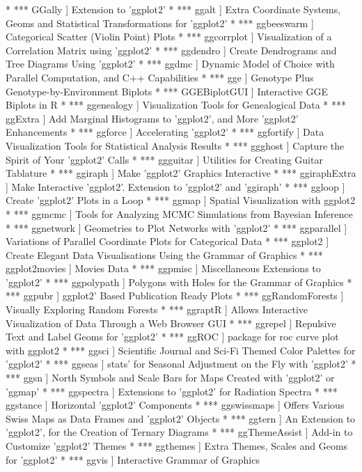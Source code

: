 * ***	GGally	]	Extension to 'ggplot2'
* ***	ggalt	]	Extra Coordinate Systems, Geoms and Statistical Transformations for 'ggplot2'
* ***	ggbeeswarm	]	Categorical Scatter (Violin Point) Plots
* ***	ggcorrplot	]	Visualization of a Correlation Matrix using 'ggplot2'
* ***	ggdendro	]	Create Dendrograms and Tree Diagrams Using 'ggplot2'
* ***	ggdmc	]	Dynamic Model of Choice with Parallel Computation, and C++ Capabilities
* ***	gge	]	Genotype Plus Genotype-by-Environment Biplots
* ***	GGEBiplotGUI	]	Interactive GGE Biplots in R
* ***	ggenealogy	]	Visualization Tools for Genealogical Data
* ***	ggExtra	]	Add Marginal Histograms to 'ggplot2', and More 'ggplot2' Enhancements
* ***	ggforce	]	Accelerating 'ggplot2'
* ***	ggfortify	]	Data Visualization Tools for Statistical Analysis Results
* ***	ggghost	]	Capture the Spirit of Your 'ggplot2' Calls
* ***	ggguitar	]	Utilities for Creating Guitar Tablature
* ***	ggiraph	]	Make 'ggplot2' Graphics Interactive
* ***	ggiraphExtra	]	Make Interactive 'ggplot2'. Extension to 'ggplot2' and 'ggiraph'
* ***	ggloop	]	Create 'ggplot2' Plots in a Loop
* ***	ggmap	]	Spatial Visualization with ggplot2
* ***	ggmcmc	]	Tools for Analyzing MCMC Simulations from Bayesian Inference
* ***	ggnetwork	]	Geometries to Plot Networks with 'ggplot2'
* ***	ggparallel	]	Variations of Parallel Coordinate Plots for Categorical Data
* ***	ggplot2	]	Create Elegant Data Visualisations Using the Grammar of Graphics
* ***	ggplot2movies	]	Movies Data
* ***	ggpmisc	]	Miscellaneous Extensions to 'ggplot2'
* ***	ggpolypath	]	Polygons with Holes for the Grammar of Graphics
* ***	ggpubr	]	ggplot2' Based Publication Ready Plots
* ***	ggRandomForests	]	Visually Exploring Random Forests
* ***	ggraptR	]	Allows Interactive Visualization of Data Through a Web Browser GUI
* ***	ggrepel	]	Repulsive Text and Label Geoms for 'ggplot2'
* ***	ggROC	]	package for roc curve plot with ggplot2
* ***	ggsci	]	Scientific Journal and Sci-Fi Themed Color Palettes for 'ggplot2'
* ***	ggseas	]	stats' for Seasonal Adjustment on the Fly with 'ggplot2'
* ***	ggsn	]	North Symbols and Scale Bars for Maps Created with 'ggplot2' or 'ggmap'
* ***	ggspectra	]	Extensions to 'ggplot2' for Radiation Spectra
* ***	ggstance	]	Horizontal 'ggplot2' Components
* ***	ggswissmaps	]	Offers Various Swiss Maps as Data Frames and 'ggplot2' Objects
* ***	ggtern	]	An Extension to 'ggplot2', for the Creation of Ternary Diagrams
* ***	ggThemeAssist	]	Add-in to Customize 'ggplot2' Themes
* ***	ggthemes	]	Extra Themes, Scales and Geoms for 'ggplot2'
* ***	ggvis	]	Interactive Grammar of Graphics
